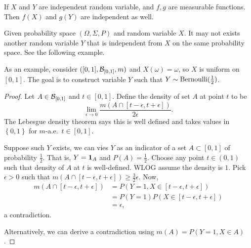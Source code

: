 \documentclass[a4paper]{article}
\begin{document}
\begin{remark}
  If $X$ and $Y$ are independent random variable, and $f, g$ are measurable functions.
  Then $f(X)$ and $g(Y)$ are independent as well.
\end{remark}

\begin{remark}
  Given probability space $(\Omega, \Sigma, P)$ and random variable $X$.
  It may not exists another random variable $Y$ that is independent from $X$
  on the same probability space.
  See the following example.
\end{remark}

\begin{eg}
  As an example, consider $([0, 1], \mathcal{B}_{[0, 1]}, m)$ and
  $X(\omega) = \omega$, so $X$ is uniform on $[0, 1]$. The goal is
  to construct variable $Y$ such that $Y \sim \operatorname{Bernoulli} (\frac{1}{2})$.

\end{eg}

\begin{proof}
  Let $A \in \mathcal{B}_{[0, 1]}$ and $t \in [0, 1]$. Define the density
  of set $A$ at point $t$ to be
  \[
    \lim_{\epsilon \to 0} \frac{m (A \cap [t - \epsilon, t + \epsilon])}
    {2 \epsilon}.
  \]
  The Lebesgue density theorem says this is well defined and
  takes values in $\left\{ 0, 1 \right\}$ for $m$-a.e.\ $t \in [0, 1]$.

  Suppose such $Y$ exists, we can vies $Y$ as an indicator of a set
  $A \subset [0, 1]$ of probability $\frac{1}{2}$. That is,
  $Y = \operatorname{\mathbf{1}}_A$ and $P (A) = \frac{1}{2}$. Choose any point $t \in (0, 1)$
  such that density of $A$ at $t$ is well-defined. WLOG assume
  the density is $1$. Pick $\epsilon > 0$ such that
  $m (A \cap [t - \epsilon, t + \epsilon]) \geq \frac{3}{2} \epsilon$.
  Now,
  \begin{align*}
    m (A \cap [t - \epsilon, t + \epsilon])
     & = P \left( Y = 1, X \in [t - \epsilon, t + \epsilon] \right)         \\
     & = P \left( Y = 1 \right) P \left( X \in [t - \epsilon, t + \epsilon]
    \right)                                                                 \\
     & = \epsilon,
  \end{align*}
  a contradiction.

  Alternatively, we can derive a contradiction using
  $m(A) = P \left( Y = 1, X \in A \right)$.

\end{proof}
\end{document}
